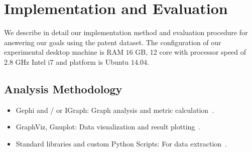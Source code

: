 
\section{Implementation and Evaluation}
\label{sec:eval}
We describe in detail our implementation method and evaluation procedure for answering 
our goals using the patent dataset. The configuration of our experimental desktop machine is RAM $16$ GB, 12 core with processor speed of
 $2.8$ GHz Intel i7 and platform is Ubuntu $14.04$.

\subsection{Analysis Methodology}

\begin{itemize}
\squish
\item Gephi and / or IGraph: Graph analysis and metric calculation~\cite{gephi, igraph}.

\item GraphViz, Gnuplot: Data visualization and result plotting~\cite{graphviz, gnuplot}.

\item Standard libraries and custom Python Scripts: For data extraction~\cite{python}.
\end{itemize}

